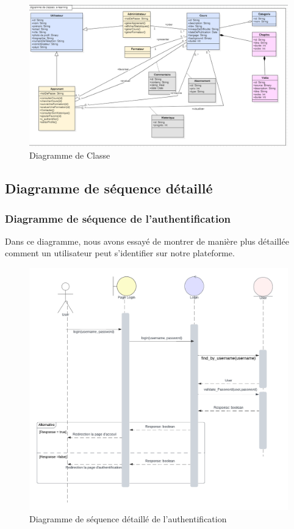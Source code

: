 \begin{figure}[H]
    \centering
    \includegraphics[width=19cm]{Figures/diagramme de classe.PNG}
    \caption{Diagramme de Classe}
\end{figure}

\subsection{Diagramme de séquence détaillé}

\subsubsection*{Diagramme de séquence de l'authentification}

Dans ce diagramme, nous avons essayé de montrer de manière plus détaillée comment un utilisateur peut s'identifier sur notre plateforme.

\begin{figure}[H]
    \centering
    \includegraphics[width=19cm]{Figures/authdetaille.png}
    \caption{Diagramme de séquence détaillé de l'authentification}
\end{figure}


